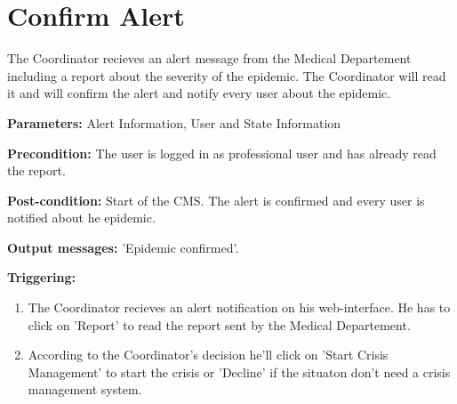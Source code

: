 \section{Confirm Alert}
\label{operation:ConfirmAlert}
The Coordinator recieves an alert message from the Medical Departement
including a report about the severity of the epidemic. The Coordinator will
read it and will confirm the alert and notify every user about the epidemic.\\
\begin{description}
\item \textbf{Parameters:} Alert Information, User and State Information
\item \textbf{Precondition:} The user is logged in as professional user and
has already read the report.
\item \textbf{Post-condition:} Start of the CMS. The alert is confirmed and
every user is notified about he epidemic.
\item \textbf{Output messages:} 'Epidemic confirmed'.
\item \textbf{Triggering:}
\begin{enumerate}
\item The Coordinator recieves an alert notification on his web-interface. He
has to click on 'Report' to read the report sent by the Medical Departement.
\item According to the Coordinator's decision he'll click on 'Start Crisis
Management' to start the crisis or 'Decline' if the situaton don't need a crisis
management system.
\end{enumerate}
\end{description}


